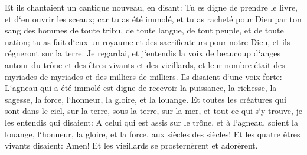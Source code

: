 \verse Et ils chantaient un cantique nouveau, en disant: Tu es digne de prendre le livre, et d`en ouvrir les sceaux; car tu as été immolé, et tu as racheté pour Dieu par ton sang des hommes de toute tribu, de toute langue, de tout peuple, et de toute nation; 
\verse tu as fait d`eux un royaume et des sacrificateurs pour notre Dieu, et ils régneront sur la terre. 
\verse Je regardai, et j`entendis la voix de beaucoup d`anges autour du trône et des êtres vivants et des vieillards, et leur nombre était des myriades de myriades et des milliers de milliers. 
\verse Ils disaient d`une voix forte: L`agneau qui a été immolé est digne de recevoir la puissance, la richesse, la sagesse, la force, l`honneur, la gloire, et la louange. 
\verse Et toutes les créatures qui sont dans le ciel, sur la terre, sous la terre, sur la mer, et tout ce qui s`y trouve, je les entendis qui disaient: A celui qui est assis sur le trône, et à l`agneau, soient la louange, l`honneur, la gloire, et la force, aux siècles des siècles! 
\verse Et les quatre êtres vivants disaient: Amen! Et les vieillards se prosternèrent et adorèrent. 

\chapter{}

